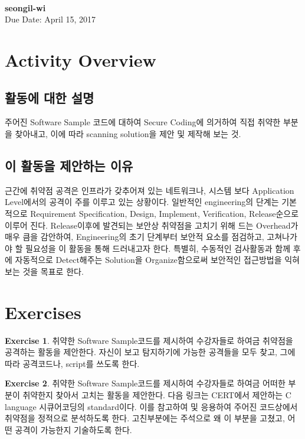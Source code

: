 \documentclass[a4paper, 11pt]{article}
\theoremstyle{definition}
\newtheorem{exercise}{Exercise}
\begin{document}
 \\
         {\phantom{} \hfill \textbf{seongil-wi}} \\
         {\phantom{} \hfill Due Date: April 15, 2017} \\

\section{Activity Overview}
  \subsection{활동에 대한 설명}
  주어진 Software Sample 코드에 대하여 Secure Coding에 의거하여 직접 취약한 부분을 찾아내고, 이에 따라 scanning solution을 제안 및 제작해 보는 것.
  \subsection{이 활동을 제안하는 이유}
   근간에 취약점 공격은 인프라가 갖추어져 있는 네트워크나, 시스템 보다 Application Level에서의 공격이 주를 이루고 있는 상황이다.\cite{Application}
   일반적인 engineering의 단계는 기본적으로 Requirement Specification, Design, Implement, Verification, Release순으로 이루어 진다. Release이후에 발견되는 보안상 취약점을 고치기 위해 드는 Overhead가 매우 큼을 감안하여, Engineering의 초기 단계부터 보안적 요소를 점검하고, 고쳐나가야 할 필요성을 이 활동을 통해 드러내고자 한다. 특별히, 수동적인 검사활동과 함께 후에 자동적으로 Detect해주는 Solution을 Organize함으로써 보안적인 접근방법을 익혀보는 것을 목표로 한다.
\section{Exercises}

\begin{exercise}
 
  취약한 Software Sample코드를 제시하여 수강자들로 하여금 취약점을 공격하는 활동을 제안한다. 자신이 보고 탐지하기에 가능한 공격들을 모두 찾고, 그에 따라 공격코드나, script를 쓰도록 한다.

\end{exercise}

\begin{exercise}

  취약한 Software Sample코드를 제시하여 수강자들로 하여금 어떠한 부분이 취약한지 찾아서 고치는 활동을 제안한다. 다음 링크\cite{Standard}는 CERT에서 제안하는 C language 시큐어코딩의 standard이다. 이를 참고하여 및 응용하여 주어진 코드상에서 취약점을 정적으로 분석하도록 한다.
  고친부분에는 주석으로 왜 이 부분을 고쳤고, 어떤 공격이 가능한지 기술하도록 한다.

\end{exercise}
\end{document}
